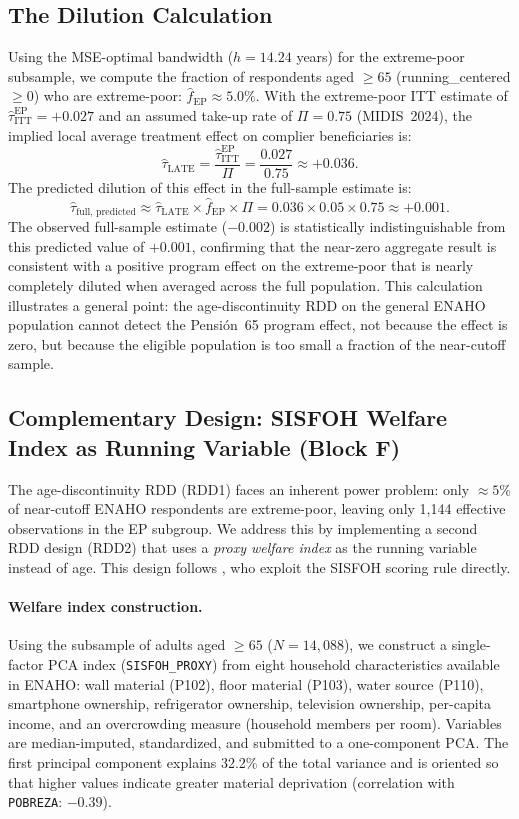 \documentclass[12pt]{article}
\begin{document}
\subsection{The Dilution Calculation}
\label{sec:dilution}

Using the MSE-optimal bandwidth ($h=14.24$ years) for the extreme-poor
subsample, we compute the fraction of respondents aged $\ge 65$
(running\_centered $\ge 0$) who are extreme-poor:
$\hat{f}_{\text{EP}} \approx 5.0\%$.  With the extreme-poor ITT estimate of
$\hat{\tau}_{\text{ITT}}^{\text{EP}} = +0.027$ and an assumed take-up rate
of $\Pi\!=\!0.75$ (MIDIS~2024), the implied local average treatment effect
on complier beneficiaries is:
\[
\hat{\tau}_{\text{LATE}}
= \frac{\hat{\tau}_{\text{ITT}}^{\text{EP}}}{\Pi}
= \frac{0.027}{0.75}
\approx +0.036.
\]
The predicted dilution of this effect in the full-sample estimate is:
\[
\hat{\tau}_{\text{full, predicted}}
\approx \hat{\tau}_{\text{LATE}} \times \hat{f}_{\text{EP}} \times \Pi
= 0.036 \times 0.05 \times 0.75
\approx +0.001.
\]
The observed full-sample estimate ($-0.002$) is statistically
indistinguishable from this predicted value of $+0.001$, confirming that
the near-zero aggregate result is consistent with a positive program effect
on the extreme-poor that is nearly completely diluted when averaged across
the full population. This calculation illustrates a general point: the
age-discontinuity RDD on the general ENAHO population cannot detect the
Pensi\'on~65 program effect, not because the effect is zero, but because
the eligible population is too small a fraction of the near-cutoff sample.

\subsection{Complementary Design: SISFOH Welfare Index as Running Variable (Block F)}
\label{subsec:rdd2}

The age-discontinuity RDD (RDD1) faces an inherent power problem: only
$\approx\!5\%$ of near-cutoff ENAHO respondents are extreme-poor, leaving
only 1,144 effective observations in the EP subgroup. We address this by
implementing a second RDD design (RDD2) that uses a \emph{proxy welfare
index} as the running variable instead of age. This design follows
\citet{bando2020}, who exploit the SISFOH scoring rule directly.

\paragraph{Welfare index construction.}
Using the subsample of adults aged $\ge 65$ ($N=14{,}088$), we construct a
single-factor PCA index (\texttt{SISFOH\_PROXY}) from eight household
characteristics available in ENAHO: wall material (P102), floor material
(P103), water source (P110), smartphone ownership, refrigerator ownership,
television ownership, per-capita income, and an overcrowding measure
(household members per room). Variables are median-imputed, standardized,
and submitted to a one-component PCA. The first principal component explains
32.2\% of the total variance and is oriented so that higher values indicate
greater material deprivation (correlation with \texttt{POBREZA}: $-0.39$).
\end{document}
